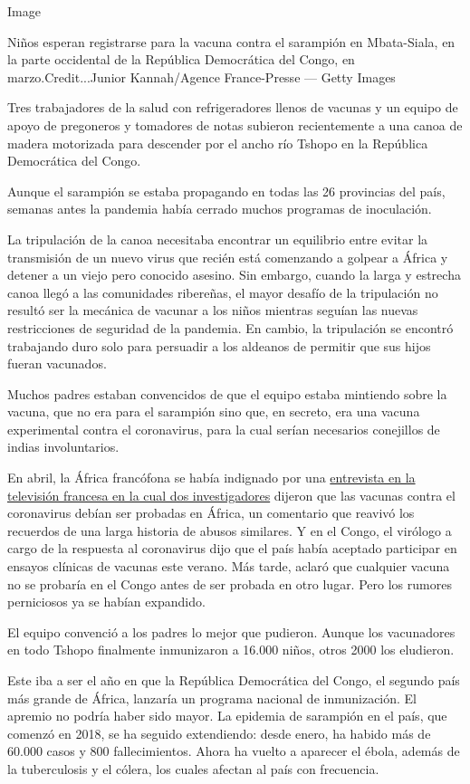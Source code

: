 Image

Niños esperan registrarse para la vacuna contra el sarampión en
Mbata-Siala, en la parte occidental de la República Democrática del
Congo, en marzo.Credit...Junior Kannah/Agence France-Presse --- Getty
Images

Tres trabajadores de la salud con refrigeradores llenos de vacunas y un
equipo de apoyo de pregoneros y tomadores de notas subieron
recientemente a una canoa de madera motorizada para descender por el
ancho río Tshopo en la República Democrática del Congo.

Aunque el sarampión se estaba propagando en todas las 26 provincias del
país, semanas antes la pandemia había cerrado muchos programas de
inoculación.

La tripulación de la canoa necesitaba encontrar un equilibrio entre
evitar la transmisión de un nuevo virus que recién está comenzando a
golpear a África y detener a un viejo pero conocido asesino. Sin
embargo, cuando la larga y estrecha canoa llegó a las comunidades
ribereñas, el mayor desafío de la tripulación no resultó ser la mecánica
de vacunar a los niños mientras seguían las nuevas restricciones de
seguridad de la pandemia. En cambio, la tripulación se encontró
trabajando duro solo para persuadir a los aldeanos de permitir que sus
hijos fueran vacunados.

Muchos padres estaban convencidos de que el equipo estaba mintiendo
sobre la vacuna, que no era para el sarampión sino que, en secreto, era
una vacuna experimental contra el coronavirus, para la cual serían
necesarios conejillos de indias involuntarios.

En abril, la África francófona se había indignado por una
\href{https://www.bbc.com/news/world-europe-52151722}{entrevista en la
televisión francesa en la cual dos investigadores} dijeron que las
vacunas contra el coronavirus debían ser probadas en África, un
comentario que reavivó los recuerdos de una larga historia de abusos
similares. Y en el Congo, el virólogo a cargo de la respuesta al
coronavirus dijo que el país había aceptado participar en ensayos
clínicas de vacunas este verano. Más tarde, aclaró que cualquier vacuna
no se probaría en el Congo antes de ser probada en otro lugar. Pero los
rumores perniciosos ya se habían expandido.

El equipo convenció a los padres lo mejor que pudieron. Aunque los
vacunadores en todo Tshopo finalmente inmunizaron a 16.000 niños, otros
2000 los eludieron.

Este iba a ser el año en que la República Democrática del Congo, el
segundo país más grande de África, lanzaría un programa nacional de
inmunización. El apremio no podría haber sido mayor. La epidemia de
sarampión en el país, que comenzó en 2018, se ha seguido extendiendo:
desde enero, ha habido más de 60.000 casos y 800 fallecimientos. Ahora
ha vuelto a aparecer el ébola, además de la tuberculosis y el cólera,
los cuales afectan al país con frecuencia.


